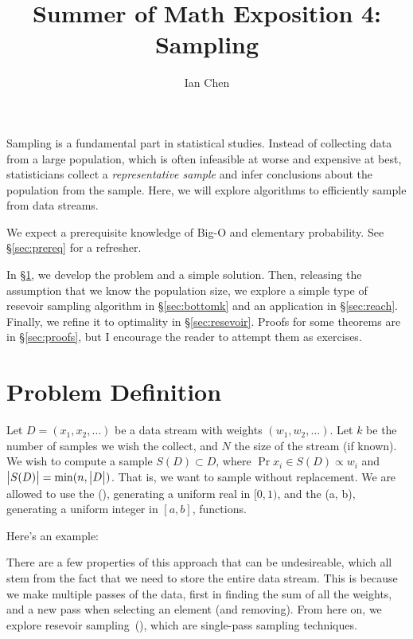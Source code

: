 \documentclass{article}
\title{Summer of Math Exposition 4: Sampling}
\author{Ian Chen}
\begin{document}
\maketitle

Sampling is a fundamental part in statistical studies.
Instead of collecting data from a large population, which is often infeasible at worse and expensive at best, statisticians collect a \emph{representative sample} and infer conclusions about the population from the sample.
Here, we will explore algorithms to efficiently sample from data streams.

We expect a prerequisite knowledge of Big-O and elementary probability.
See \S\ref{sec:prereq} for a refresher.

In \S\ref{sec:problem}, we develop the problem and a simple solution.
Then, releasing the assumption that we know the population size, we explore a simple type of resevoir sampling algorithm in \S\ref{sec:bottomk} and an application in \S\ref{sec:reach}.
Finally, we refine it to optimality in \S\ref{sec:resevoir}.
Proofs for some theorems are in \S\ref{sec:proofs}, but I encourage the reader to attempt them as exercises.

\section{Problem Definition}
\label{sec:problem}

Let $D = (x_1, x_2, \ldots)$ be a data stream with weights $(w_1, w_2, \ldots)$.
Let $k$ be the number of samples we wish the collect, and $N$ the size of the stream (if known).
We wish to compute a sample $S(D) \subset D$, where $\Pr{x_i \in S(D)} \propto w_i$ and $\left| \bigr. S(D) \right| = \min(n, \left| \bigr. D \right|)$.
That is, we want to sample without replacement.
We are allowed to use the \random(), generating a uniform real in $[0, 1)$, and the \randint(a, b), generating a uniform integer in $[a, b]$, functions.

Here's an example:

There are a few properties of this approach that can be undesireable, which all stem from the fact that we need to store the entire data stream.
This is because we make multiple passes of the data, first in finding the sum of all the weights, and a new pass when selecting an element (and removing).
From here on, we explore resevoir sampling~(\cite{vitter85-03}), which are single-pass sampling techniques.
\end{document}
